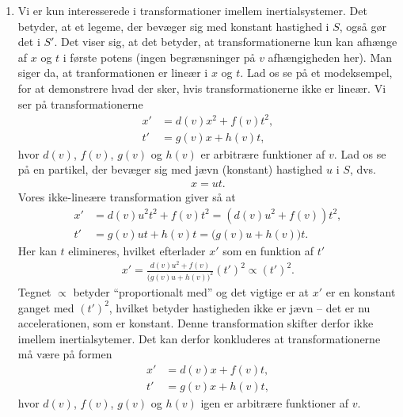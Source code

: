 \begin{enumerate}
    \item Vi er kun interesserede i transformationer imellem inertialsystemer. Det betyder, at et legeme, der bevæger sig med konstant hastighed i $S$, også gør det i $S'$.
    Det viser sig, at det betyder, at transformationerne kun kan afhænge af $x$ og $t$ i første potens (ingen begrænsninger på $v$ afhængigheden her).
    Man siger da, at tranformationen er lineær i $x$ og $t$.
    Lad os se på et modeksempel, for at demonstrere hvad der sker, hvis transformationerne ikke er lineær.
    Vi ser på transformationerne
    \begin{align*}
        x' &= d(v)x^2+f(v)t^2, \\
        t' &= g(v)x+h(v)t,
    \end{align*}
    hvor $d(v)$, $f(v)$, $g(v)$ og $h(v)$ er arbitrære funktioner af $v$. Lad os se på en partikel, der bevæger sig med jævn (konstant) hastighed $u$ i $S$, dvs.
    \begin{align*}
        x=ut.
    \end{align*}
    Vores ikke-lineære transformation giver så at
    \begin{align*}
        x' &= d(v)u^2t^2+f(v)t^2 = \left(d(v)u^2+f(v)\right)t^2, \\
        t' &= g(v)ut+h(v)t = \Big(g(v)u+h(v)\Big)t.
    \end{align*}
    Her kan $t$ elimineres, hvilket efterlader $x'$ som en funktion af $t'$
    \begin{align*}
        x' = \frac{d(v)u^2+f(v)}{\big(g(v)u+h(v)\big)^2}(t')^2 \propto (t')^2.
    \end{align*}
    Tegnet $\propto$ betyder ``proportionalt med'' og det vigtige er at $x'$ er en konstant ganget med $(t')^2$, hvilket betyder hastigheden ikke er jævn -- det er nu accelerationen, som er konstant.
    Denne transformation skifter derfor ikke imellem inertialsytemer.
    Det kan derfor konkluderes at transformationerne må være på formen
    \begin{subequations}
    \begin{align}
        x' &= d(v)x+f(v)t, \\
        t' &= g(v)x+h(v)t,
    \end{align}
    \end{subequations}
    hvor $d(v)$, $f(v)$, $g(v)$ og $h(v)$ igen er arbitrære funktioner af $v$.

\end{enumerate}

